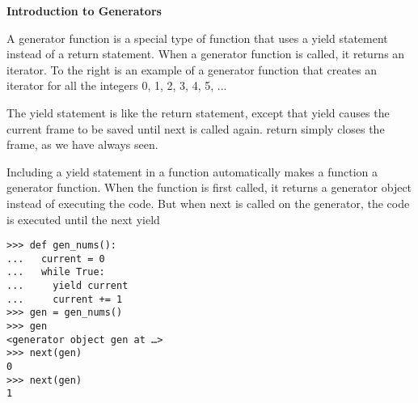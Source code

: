 \textbf{Introduction to Generators}

A generator function is a special type of function that uses a yield statement instead of a return statement. When a generator function is called, it returns an iterator.
To the right is an example of a generator function that creates an iterator for all the integers 0, 1, 2, 3, 4, 5, ... 

The yield statement is like the return statement, except that yield causes the current frame to be saved until next is called again. return simply closes the frame, as we have always seen. 

Including a yield statement in a function automatically makes a function a generator function. When the function is first called, it returns a generator object instead of executing the code. But when next is called on the generator, the code is executed until the next yield

\begin{lstlisting}
>>> def gen_nums():
...   current = 0
...   while True:
...     yield current
...     current += 1
>>> gen = gen_nums()
>>> gen
<generator object gen at …>
>>> next(gen)
0
>>> next(gen)
1
\end{lstlisting}